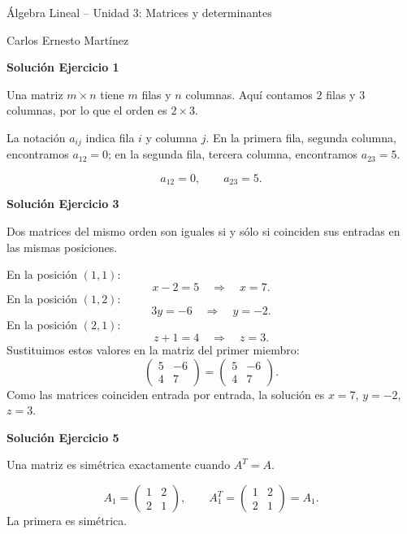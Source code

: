 \documentclass[12pt]{article}
\begin{document}
\par
\medskip
\noindent Álgebra Lineal -- Unidad 3: Matrices y determinantes\par
\noindent Carlos Ernesto Martínez\par
\bigskip
{}
\par\bigskip\noindent\textbf{Solución Ejercicio 1}\par\nobreak
Una matriz $m\times n$ tiene $m$ filas y $n$ columnas. Aquí contamos $2$ filas y $3$ columnas, por lo que el orden es $\boxed{2\times3}$.

La notación $a_{ij}$ indica fila $i$ y columna $j$. En la primera fila, segunda columna, encontramos $a_{12}=0$; en la segunda fila, tercera columna, encontramos $a_{23}=5$.

\[
\boxed{a_{12}=0,\qquad a_{23}=5}.
\]

\par\bigskip\noindent\textbf{Solución Ejercicio 3}\par\nobreak
Dos matrices del mismo orden son iguales si y sólo si coinciden sus entradas en las mismas posiciones.

En la posición $(1,1)$:
\[
x - 2=5\quad\Longrightarrow\quad x=7.
\]
En la posición $(1,2)$:
\[
3 y=-6\quad\Longrightarrow\quad y=-2.
\]
En la posición $(2,1)$:
\[
z + 1=4\quad\Longrightarrow\quad z=3.
\]
Sustituimos estos valores en la matriz del primer miembro:
\[
\begin{pmatrix}5&-6\\4&7\end{pmatrix}=\begin{pmatrix}5&-6\\4&7\end{pmatrix}.
\]
Como las matrices coinciden entrada por entrada, la solución es $x=7$, $y=-2$, $z=3$.


\par\bigskip\noindent\textbf{Solución Ejercicio 5}\par\nobreak
Una matriz es simétrica exactamente cuando $A^T=A$.

\[
A_1=\begin{pmatrix}1&2\\2&1\end{pmatrix},\qquad A_1^T=\begin{pmatrix}1&2\\2&1\end{pmatrix}=A_1.
\]
La primera es simétrica.
\end{document}
